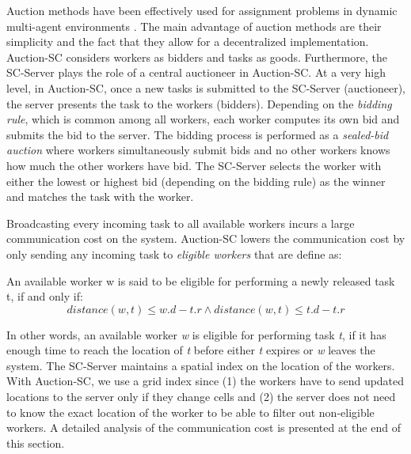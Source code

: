 
Auction methods have been effectively used for assignment problems in dynamic multi-agent environments \cite{Mehta05,Lagoudakis04}. The main advantage of auction methods are their simplicity and the fact that they allow for a decentralized implementation. Auction-SC considers workers as bidders and tasks as goods. Furthermore, the SC-Server plays the role of a central auctioneer in Auction-SC. At a very high level, in Auction-SC, once a new tasks is submitted to the SC-Server (auctioneer), the server presents the task to the workers (bidders). Depending on the \textit{bidding rule}, which is common among all workers, each worker computes its own bid and submits the bid to the server. The bidding process is performed as a \textit{sealed-bid auction} where workers simultaneously submit bids and no other workers knows how much the other workers have bid. The SC-Server selects the worker with either the lowest or highest bid (depending on the bidding rule) as the winner and matches the task with the worker.

Broadcasting every incoming task to all available workers incurs a large communication cost on the system. Auction-SC lowers the communication cost by only sending any incoming task to \textit{eligible workers} that are define as:

\begin{definition} 
An available worker w is said to be eligible for performing a newly released task t, if and only if:
\begin{equation*}
distance(w, t) \leq w.d - t.r \wedge distance(w, t) \leq t.d - t.r
\end{equation*}
\end{definition}

\noindent In other words, an available worker \textit{w} is eligible for performing task \textit{t}, if it has enough time to reach the location of \textit{t} before either \textit{t} expires or \textit{w} leaves the system. The SC-Server maintains a spatial index on the location of the workers. With Auction-SC, we use a grid index since (1) the workers have to send updated locations to the server only if they change cells and (2) the server does not need to know the exact location of the worker to be able to filter out non-eligible workers. A detailed analysis of the communication cost is presented at the end of this section.

